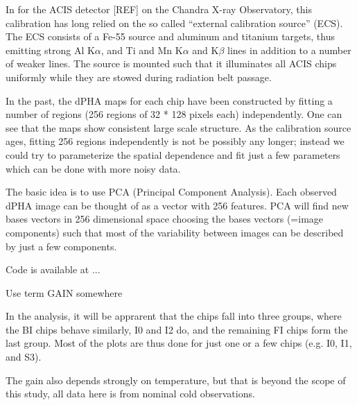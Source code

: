 \documentclass[]{spie}  %
\begin{document}
In for the ACIS detector [REF] on the Chandra X-ray Observatory, this calibration has long relied on the so called ``external calibration source'' (ECS). The ECS consists of a Fe-55 source and aluminum and titanium targets, thus emitting strong Al K$\alpha$, and Ti and Mn K$\alpha$ and K$\beta$ lines in addition to a number of weaker lines. The source is mounted such that it illuminates all ACIS chips uniformly while they are stowed during radiation belt passage.

In the past, the dPHA maps for each chip have been constructed by fitting a number of regions (256 regions of 32 * 128 pixels each) independently. One can see that the maps show consistent large scale structure. As the calibration source ages, fitting 256 regions independently is not be possibly any longer; instead we could try to parameterize the spatial dependence and fit just a few parameters which can be done with more noisy data.

The basic idea is to use PCA (Principal Component Analysis). Each observed dPHA image can be thought of as a vector with 256 features. PCA will find new bases vectors in 256 dimensional space choosing the bases vectors (=image components) such that most of the variability between images can be described by just a few components.

Code is available at ...

Use term GAIN somewhere

In the analysis, it will be apprarent that the chips fall into three groups, where the BI chips behave similarly, I0 and I2 do, and the remaining FI chips form the last group. Most of the plots are thus done for just one or a few chips (e.g. I0, I1, and S3).

The gain also depends strongly on temperature, but that is beyond the scope of this study, all data here is from nominal cold observations.
\end{document}
